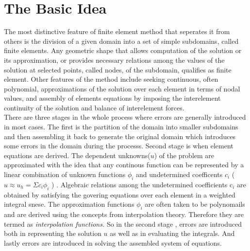 \documentclass{report}
\numberwithin{equation}{chapter}
\begin{document}
\section{The Basic Idea}
\begin{spacing}{1.5}
The most distinctive feature of finite element method that seperates it from others is the division of a given domain into a set of simple subdomains, called finite elements. Any geometric shape that allows computation of the solution or its approximation, or provides necessary relations among the values of the solution at selected points, called nodes, of the subdomain, qualifies as finite element. Other features of the method include seeking continuous, often polynomial, approximations of the solution over each element in terms of nodal values, and assembly of elements equations by imposing the interelement continuity of the solution and balance of interelement forces.\\
There are three stages in the whole process where errors are generally introduced in most cases. The first is the partition of the domain into smaller subdomains and then assembling it back to generate the original domain which introduces some errors in the domain during the processs. Second stage is when element equations are derived. The dependent unknowns($u$) of the problem are approximated with the idea that any continous function can be represented by a linear combination of unknown functions $ \phi_{i} $ and undetermined coefficents $ c_{i} $ ( $ u \approx u_{h} = \Sigma {c_{i}\phi_{i}}$ ) . Algebraic relations among the undetermined coefficients  c$_{i}$ are obtained by satisfying the govering equations over each element in a weighted integral snese. The approximation functions $ \phi_{i}$ are often taken to be polynomails and are derived using the concepts from interpolation theory. Therefore they are termed as \textsl{interpolation functions. }So in the second stage , errors are introduced both in representing the solution $ u $ as well as in evaluating the integrals. And lastly errors are introduced in solving the assembled system of equations.
\end{spacing}
\end{document}
